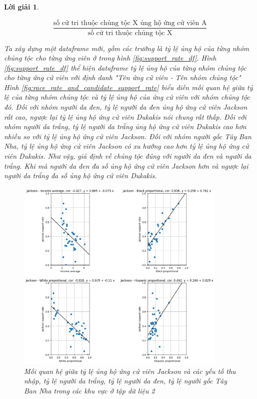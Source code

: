 \documentclass[14pt, a4paper]{article}
\theoremstyle{sltheorem}
\theoremstyle{soltheorem}
\newtheorem*{loigiai}{Lời giải}
\begin{document}
\begin{loigiai}
\begin{enumerate}
    \begin{equation*}
        \dfrac{\text{số cử tri thuộc chủng tộc X ủng hộ ứng cử viên A}}{\text{số cử tri thuộc chủng tộc X}}
    \end{equation*}

    Ta xây dựng một dataframe mới, gồm các trường là tỷ lệ ủng hộ của từng nhóm chủng tộc cho từng ứng viên ở trong hình \ref{fig:support_rate_df}.
    Hình \ref{fig:support_rate_df} thể hiện dataframe tỷ lệ ủng hộ của từng nhóm chủng tộc cho từng ứng cử viên với định danh "Tên ứng cử viên - Tên nhóm chủng tộc"
    Hình \ref{fig:race_rate_and_candidate_support_rate} biểu diễn mối quan hệ giữa tỷ lệ của từng nhóm chủng tộc và tỷ lệ ủng hộ của ứng cử viên với nhóm chủng tộc đó.
    Đối với nhóm người da đen, tỷ lệ người da đen ủng hộ ứng cử viên Jackson rất cao, ngược lại tỷ lệ ủng hộ ứng cử viên Dukakis nói chung rất thấp.
    Đối với nhóm người da trắng, tỷ lệ người da trắng ủng hộ ứng cử viên Dukakis cao hơn nhiều so với tỷ lệ ủng hộ ứng cử viên Jackson.
    Đối với nhóm người gốc Tây Ban Nha, tỷ lệ ủng hộ ứng cử viên Jackson có xu hướng cao hơn tỷ lệ ủng hộ ứng cử viên Dukakis.
    Như vậy, giả định về chủng tộc đúng với người da đen và người da trắng.
    Khi mà người da đen đa số ủng hộ ứng cử viên Jackson hơn và ngược lại người da trắng đa số ủng hộ ứng cử viên Dukakis.

    \begin{figure}[H]
        \centering
        \includegraphics[width=0.9\textwidth]{figures/Jackson_candidate_relationship_factor.png}
        \caption{Mối quan hệ giữa tỷ lệ ủng hộ ứng cử viên Jackson và các yếu tố thu nhập, tỷ lệ người da trắng, tỷ lệ người da đen, tỷ lệ người gốc Tây Ban Nha trong các khu vực ở tập dữ liệu 2}
        \label{fig:Jackson_candidate_relationship_factor}
    \end{figure}


\end{enumerate}
\end{loigiai}
\end{document}
